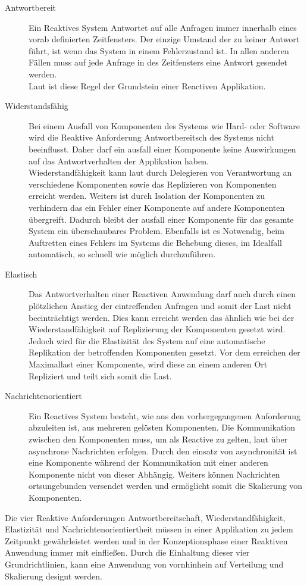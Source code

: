 \begin{description}
    \item[Antwortbereit]\label{reactivo:responsive}
    Ein Reaktives System Antwortet auf alle Anfragen immer innerhalb eines vorab definierten Zeitfensters. Der einzige Umstand der zu keiner Antwort führt, ist wenn das System in einem Fehlerzustand ist. In allen anderen Fällen muss auf jede Anfrage in des Zeitfensters eine Antwort gesendet werden.\\
    Laut \cite{reactiveManifesto} ist diese Regel der Grundstein einer {Reactiven} Applikation.
    \item[Widerstandsfähig]\label{reactivo:resilient}
    Bei einem Ausfall von Komponenten des Systems wie Hard- oder Software wird die Reaktive Anforderung {Antwortbereitsch} des Systems nicht beeinflusst. Daher darf ein ausfall einer Komponente keine Auswirkungen auf das Antwortverhalten der Applikation haben.\\
    Wiederstandfähigkeit kann laut \cite{reactiveManifesto} durch Delegieren von Verantwortung an verschiedene Komponenten sowie das Replizieren von Komponenten erreicht werden. Weiters ist durch Isolation der Komponenten zu verhindern das ein Fehler einer Komponente auf andere Komponenten übergreift. Dadurch bleibt der ausfall einer Komponente für das gesamte System ein überschaubares Problem. Ebenfalls ist es Notwendig, beim Auftretten eines Fehlers im Systems die Behebung dieses, im Idealfall automatisch, so schnell wie möglich durchzuführen.
    \item[Elastisch]\label{reactivo:elastic}
    Das Antwortverhalten einer Reactiven Anwendung darf auch durch einen plötzlichen Anstieg der eintreffenden Anfragen und somit der Last nicht beeinträchtigt werden. Dies kann erreicht werden das ähnlich wie bei der Wiederstandfähigkeit auf Replizierung der Komponenten gesetzt wird. Jedoch wird für die Elastizität des System auf eine automatische Replikation der betroffenden Komponenten gesetzt. Vor dem erreichen der Maximallast einer Komponente, wird diese an einem anderen Ort Repliziert und teilt sich somit die Last. 
    \item[Nachrichtenorientiert]\label{reactivo:messageDriven}
    Ein Reactives System besteht, wie aus den vorhergegangenen Anforderung abzuleiten ist, aus mehreren gelösten Komponenten. Die Kommunikation zwischen den Komponenten muss, um als Reactive zu gelten, laut \cite{reactiveManifesto}  über asynchrone Nachrichten erfolgen. Durch den einsatz von asynchronität ist eine Komponente während der Kommunikation mit einer anderen Komponente nicht von dieser Abhängig. Weiters können Nachrichten ortsungebunden versendet werden und ermöglicht somit die Skalierung von Komponenten. 
\end{description} 
Die vier {Reaktive} Anforderungen Antwortbereitschaft, Wiederstandfähigkeit, Elastizität und Nachrichtenorientiertheit müssen in einer Applikation zu jedem Zeitpunkt gewährleistet werden und in der Konzeptionsphase einer Reaktiven Anwendung immer mit einfließen. Durch die Einhaltung dieser vier Grundrichtlinien, kann eine Anwendung von vornhinhein auf Verteilung und Skalierung designt werden.

